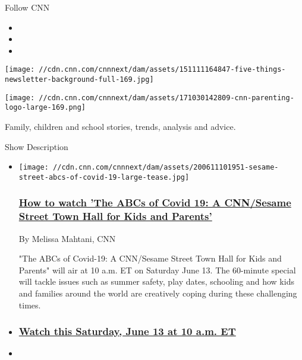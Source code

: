 Follow CNN

\begin{itemize}
\item
\item
\item
\end{itemize}

\texttt{[image: //cdn.cnn.com/cnnnext/dam/assets/151111164847-five-things-newsletter-background-full-169.jpg]}

\texttt{[image: //cdn.cnn.com/cnnnext/dam/assets/171030142809-cnn-parenting-logo-large-169.png]}

Family, children and school stories, trends, analysis and advice.

Show Description

\begin{itemize}
\item
  \href{/2020/06/11/us/how-to-watch-abcs-of-covid-19/index.html}{}

  \texttt{[image: //cdn.cnn.com/cnnnext/dam/assets/200611101951-sesame-street-abcs-of-covid-19-large-tease.jpg]}

  \hypertarget{how-to-watch-the-abcs-of-covid-19-a-cnnsesame-street-town-hall-for-kids-and-parents}{%
  \subsubsection{\texorpdfstring{\href{/2020/06/11/us/how-to-watch-abcs-of-covid-19/index.html}{How
  to watch 'The ABCs of Covid 19: A CNN/Sesame Street Town Hall for Kids
  and
  Parents'}}{How to watch 'The ABCs of Covid 19: A CNN/Sesame Street Town Hall for Kids and Parents'}}\label{how-to-watch-the-abcs-of-covid-19-a-cnnsesame-street-town-hall-for-kids-and-parents}}

  By Melissa Mahtani, CNN

  "The ABCs of Covid-19: A CNN/Sesame Street Town Hall for Kids and
  Parents" will air at 10 a.m. ET on Saturday June 13. The 60-minute
  special will tackle issues such as summer safety, play dates,
  schooling and how kids and families around the world are creatively
  coping during these challenging times.
\item
  \hypertarget{watch-this-saturday-june-13-at-10-am-et}{%
  \subsubsection{\texorpdfstring{\href{/2020/06/11/us/how-to-watch-abcs-of-covid-19/index.html}{\textbf{Watch
  this Saturday, June 13 at 10 a.m.
  ET}}}{Watch this Saturday, June 13 at 10 a.m. ET}}\label{watch-this-saturday-june-13-at-10-am-et}}
\item
  \hypertarget{will-schools-be-safe-this-fall-experts-weigh-in}{%
}
\end{itemize}
